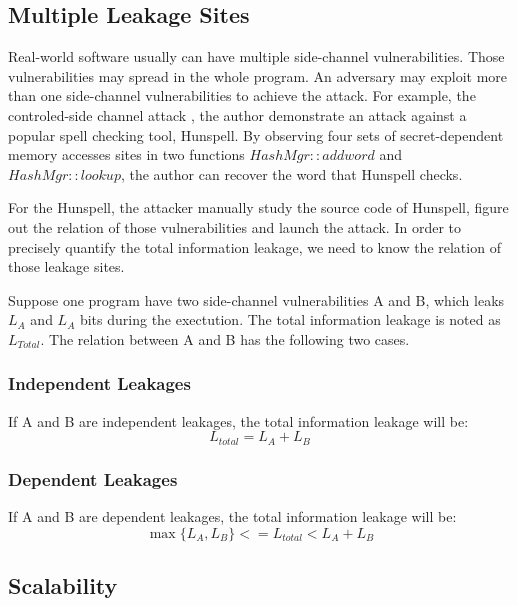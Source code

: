 \subsection{Multiple Leakage Sites}
Real-world software usually can have multiple side-channel vulnerabilities. Those vulnerabilities 
may spread in the whole program. An adversary may exploit more than one side-channel vulnerabilities 
to achieve the attack. For example, the controled-side channel attack \cite{7163052}, the author 
demonstrate an attack against a popular spell checking tool, Hunspell. By observing four sets 
of secret-dependent memory accesses sites in two functions $HashMgr::addword$ and $HashMgr::lookup$, 
the author can recover the word that Hunspell checks.

For the Hunspell, the attacker manually study the source code of Hunspell, figure out
the relation of those vulnerabilities and launch the attack. In order to precisely quantify the
total information leakage, we need to know the relation of those leakage sites. 

Suppose one program have two side-channel vulnerabilities A and B, which leaks $L_A$ and $L_A$ bits
during the exectution. The total information leakage is noted as $L_{Total}$. The relation between
A and B has the following two cases.

\subsubsection{Independent Leakages}
If A and B are independent leakages, the total information leakage will be:
\begin{equation}
\label{independent leakage}
    L_{total} = L_A + L_B
\end{equation} 

\subsubsection{Dependent Leakages}
If A and B are dependent leakages, the total information leakage will be:
\begin{equation}
\label{independent leakage}
    \max{\{L_A, L_B\}}  <= L_{total} < L_A + L_B
\end{equation}

\subsection{Scalability}



